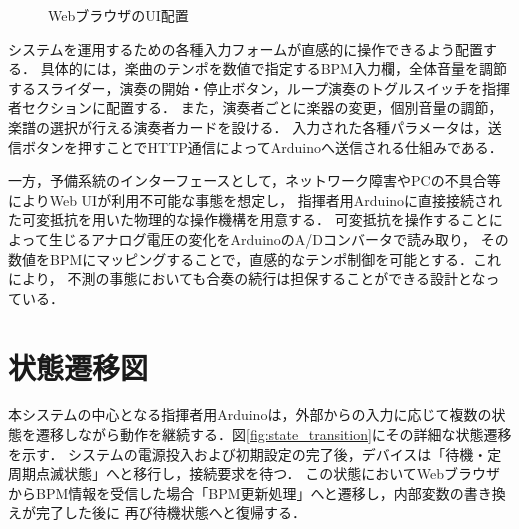 \documentclass[lualatex,book,openany,paper=a4paper,jafontsize=11.5pt,jafontscale=1.05]{jlreq}
\begin{document}
\begin{figure}[H]
  \caption{WebブラウザのUI配置}
  \label{fig:web_ui}
\end{figure}

システムを運用するための各種入力フォームが直感的に操作できるよう配置する．
具体的には，楽曲のテンポを数値で指定するBPM入力欄，全体音量を調節するスライダー，演奏の開始・停止ボタン，ループ演奏のトグルスイッチを指揮者セクションに配置する．
また，演奏者ごとに楽器の変更，個別音量の調節，楽譜の選択が行える演奏者カードを設ける．
入力された各種パラメータは，送信ボタンを押すことでHTTP通信によってArduinoへ送信される仕組みである．


一方，予備系統のインターフェースとして，ネットワーク障害やPCの不具合等によりWeb UIが利用不可能な事態を想定し，
指揮者用Arduinoに直接接続された可変抵抗を用いた物理的な操作機構を用意する．
可変抵抗を操作することによって生じるアナログ電圧の変化をArduinoのA/Dコンバータで読み取り，
その数値をBPMにマッピングすることで，直感的なテンポ制御を可能とする．これにより，
不測の事態においても合奏の続行は担保することができる設計となっている．

\section{状態遷移図}
本システムの中心となる指揮者用Arduinoは，外部からの入力に応じて複数の状態を遷移しながら動作を継続する．図\ref{fig:state_transition}にその詳細な状態遷移を示す．
システムの電源投入および初期設定の完了後，デバイスは「待機・定周期点滅状態」へと移行し，接続要求を待つ．
この状態においてWebブラウザからBPM情報を受信した場合「BPM更新処理」へと遷移し，内部変数の書き換えが完了した後に
再び待機状態へと復帰する．
\end{document}
